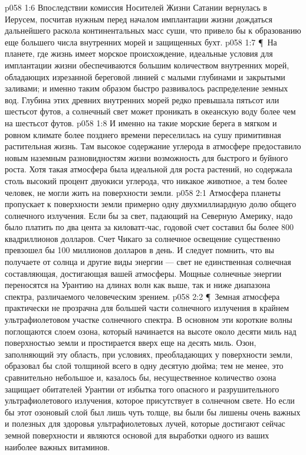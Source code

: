\vs p058 1:6 Впоследствии комиссия Носителей Жизни Сатании вернулась в Иерусем, посчитав нужным перед началом имплантации жизни дождаться дальнейшего раскола континентальных масс суши, что привело бы к образованию еще большего числа внутренних морей и защищенных бухт.
\vs p058 1:7 \P\ На планете, где жизнь имеет морское происхождение, идеальные условия для имплантации жизни обеспечиваются большим количеством внутренних морей, обладающих изрезанной береговой линией с малыми глубинами и закрытыми заливами; и именно таким образом быстро развивалось распределение земных вод. Глубина этих древних внутренних морей редко превышала пятьсот или шестьсот футов, а солнечный свет может проникать в океанскую воду более чем на шестьсот футов.
\vs p058 1:8 И именно на такие морские берега в мягком и ровном климате более позднего времени переселилась на сушу примитивная растительная жизнь. Там высокое содержание углерода в атмосфере предоставило новым наземным разновидностям жизни возможность для быстрого и буйного роста. Хотя такая атмосфера была идеальной для роста растений, но содержала столь высокий процент двуокиси углерода, что никакое животное, а тем более человек, не могли жить на поверхности земли.
\vs p058 2:1 Атмосфера планеты пропускает к поверхности земли примерно одну двухмиллиардную долю общего солнечного излучения. Если бы за свет, падающий на Северную Америку, надо было платить по два цента за киловатт\hyp{}час, годовой счет составил бы более 800 квадриллионов долларов. Счет Чикаго за солнечное освещение существенно превзошел бы 100 миллионов долларов в день. И следует помнить, что вы получаете от солнца и другие виды энергии --- свет не единственная солнечная составляющая, достигающая вашей атмосферы. Мощные солнечные энергии переносятся на Урантию на длинах волн как выше, так и ниже диапазона спектра, различаемого человеческим зрением.
\vs p058 2:2 \P\ Земная атмосфера практически не прозрачна для большей части солнечного излучения в крайнем ультрафиолетовом участке солнечного спектра. В основном эти короткие волны поглощаются слоем озона, который начинается на высоте около десяти миль над поверхностью земли и простирается вверх еще на десять миль. Озон, заполняющий эту область, при условиях, преобладающих у поверхности земли, образовал бы слой толщиной всего в одну десятую дюйма; тем не менее, это сравнительно небольшое и, казалось бы, несущественное количество озона защищает обитателей Урантии от избытка того опасного и разрушительного ультрафиолетового излучения, которое присутствует в солнечном свете. Но если бы этот озоновый слой был лишь чуть толще, вы были бы лишены очень важных и полезных для здоровья ультрафиолетовых лучей, которые достигают сейчас земной поверхности и являются основой для выработки одного из ваших наиболее важных витаминов.
